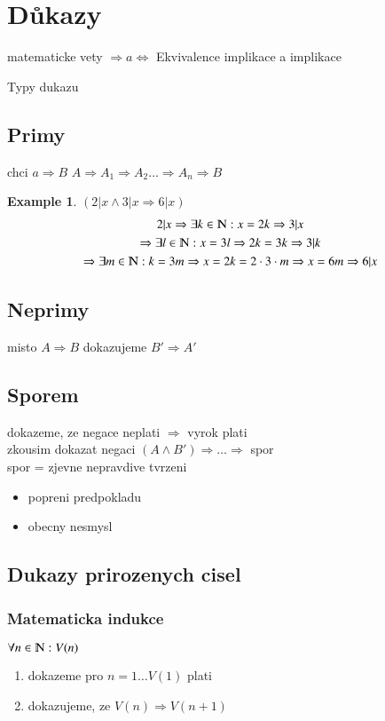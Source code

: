 \documentclass{article}
\theoremstyle{definition}
\newtheorem{exmp}{Example}[section]
\begin{document}
\section{Důkazy}


matematicke vety $\Rightarrow a \Leftrightarrow$
Ekvivalence implikace a implikace

Typy dukazu

\subsection{Primy}
chci $a \Rightarrow B$
$A \Rightarrow A_1 \Rightarrow A_2 \dots \Rightarrow A_n \Rightarrow B$

\begin{exmp}
    $(2|x \land 3|x \Rightarrow 6|x)$
    \begin{gather}
        2|x \Rightarrow \exists k \in \varmathbb{N}: x = 2k \Rightarrow  3|x \\
        \Rightarrow \exists l \in \varmathbb{N}: x = 3l \Rightarrow 2k = 3k \Rightarrow 3|k \\ \Rightarrow 
        \exists m \in \varmathbb{N}: k = 3m \Rightarrow x = 2k = 2 \cdot 3 \cdot m \Rightarrow x = 6m \Rightarrow 6|x
    \end{gather}
\end{exmp}
\subsection{Neprimy} misto $A \Rightarrow B$ dokazujeme $B' \Rightarrow A'$
\subsection{Sporem} dokazeme, ze negace neplati $\Rightarrow$ vyrok plati \\
zkousim dokazat negaci $(A\land B') \Rightarrow \dots \Rightarrow $ spor \\
spor = zjevne nepravdive tvrzeni 

\begin{itemize}
\item popreni predpokladu
\item obecny nesmysl
\end{itemize}

\subsection{Dukazy prirozenych cisel}
\subsubsection{Matematicka indukce}
$ \forall n \in \varmathbb{N}: V(n)$
\begin{enumerate}
    \item dokazeme pro $n = 1 \dots V(1)$ plati
    \item dokazujeme, ze $V(n) \Rightarrow V(n+1)$
\end{enumerate}
\end{document}

